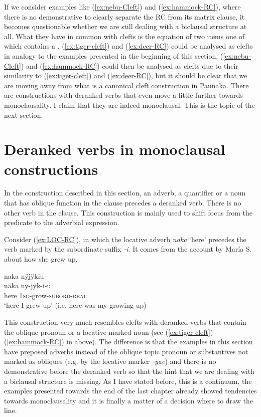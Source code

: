 If we consider examples like (\ref{ex:nebu-Cleft}) and (\ref{ex:hammock-RC}), where there is no demonstrative to clearly separate the RC from its matrix clause, it becomes questionable whether we are still dealing with a biclausal structure at all. What they have in common with clefts is the equation of two items one of which contains a . (\ref{ex:tiger-cleft}) and (\ref{ex:deer-RC}) could be analysed as clefts in analogy to the examples presented in the beginning of this section. (\ref{ex:nebu-Cleft}) and (\ref{ex:hammock-RC}) could then be analysed as clefts due to their similarity to (\ref{ex:tiger-cleft}) and (\ref{ex:deer-RC}), but it should be clear that we are moving away from what is a canonical cleft construction in Paunaka. There are constructions with deranked verbs that even move a little further towards monoclausality. I claim that they are indeed monoclausal. This is the topic of the next section.

\section{Deranked verbs in monoclausal constructions}\label{sec:AdverbialModification}

In the construction described in this section, an adverb, a quantifier or a noun that has oblique function in the clause precedes a deranked verb. There is no other verb in the clause. This construction is mainly used to shift focus from the predicate to the adverbial expression.

Consider (\ref{ex:LOC-RC}), in which the locative adverb \textit{naka} ‘here’ precedes the verb marked by the subordinate suffix \textit{-i}. It comes from the account by María S. about how she grew up.

\ea\label{ex:LOC-RC}
\begingl
\glpreamble naka nÿjÿkiu\\
\gla naka nÿ-jÿk-i-u\\
\glb here 1\textsc{sg}-grow-\textsc{subord}-\textsc{real}\\
\glft ‘here I grew up’ (i.e. here was my growing up)
\endgl
\trailingcitation{[rxx-p181101l-2.007]}
\xe

This construction very much resembles clefts with deranked verbs that contain the oblique pronoun or a locative-marked noun (see (\ref{ex:tiger-cleft})–(\ref{ex:hammock-RC}) in  above). The difference is that the examples in this section have preposed adverbs instead of the oblique topic pronoun or substantives not marked as obliques (e.g. by the locative marker \textit{-yae}) and there is no demonstrative before the deranked verb so that the hint that we are dealing with a biclausal structure is missing.  As I have stated before, this is a continuum, the examples presented towards the end of the last chapter already showed tendencies towards monoclausality and it is finally a matter of a decision where to draw the line.

